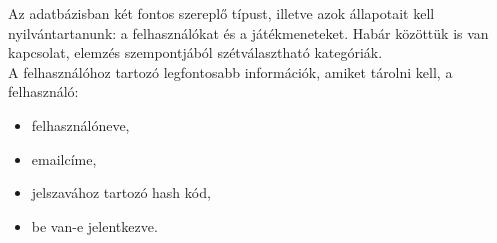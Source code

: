 









Az adatbázisban két fontos szereplő típust, illetve azok állapotait kell nyilvántartanunk: a felhasználókat és a játékmeneteket. Habár közöttük is van kapcsolat, elemzés szempontjából szétválasztható kategóriák.\\

A felhasználóhoz tartozó legfontosabb információk, amiket tárolni kell, a felhasználó:\\
\begin{itemize}
	\item felhasználóneve,
	\item emailcíme,
	\item jelszavához tartozó hash kód,
	\item be van-e jelentkezve.
\end{itemize}

